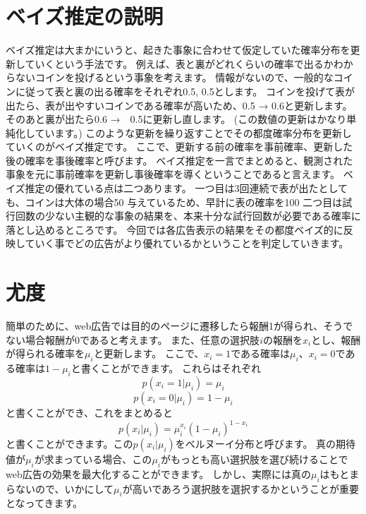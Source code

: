 \documentclass[a4j,twocolumn]{jarticle}
\begin{document}
\section{ベイズ推定の説明}
ベイズ推定は大まかにいうと、起きた事象に合わせて仮定していた確率分布を更新していくという手法です。
例えば、表と裏がどれくらいの確率で出るかわからないコインを投げるという事象を考えます。
情報がないので、一般的なコインに従って表と裏の出る確率をそれぞれ0.5, 0.5とします。
コインを投げて表が出たら、表が出やすいコインである確率が高いため、0.5 → 0.6と更新します。
そのあと裏が出たら0.6 →　0.5に更新し直します。
(この数値の更新はかなり単純化しています。)
このような更新を繰り返すことでその都度確率分布を更新していくのがベイズ推定です。
ここで、更新する前の確率を事前確率、更新した後の確率を事後確率と呼びます。
ベイズ推定を一言でまとめると、観測された事象を元に事前確率を更新し事後確率を導くということであると言えます。
ベイズ推定の優れている点は二つあります。
一つ目は3回連続で表が出たとしても、コインは大体の場合50%
与えているため、早計に表の確率を100%
二つ目は試行回数の少ない主観的な事象の結果を、本来十分な試行回数が必要である確率に落とし込めるところです。
今回では各広告表示の結果をその都度ベイズ的に反映していく事でどの広告がより優れているかということを判定していきます。
\vspace{-6mm}
\section{尤度}
簡単のために、web広告では目的のページに遷移したら報酬1が得られ、そうでない場合報酬が0であると考えます。
また、任意の選択肢$i$の報酬を$x_i$とし、報酬が得られる確率を$\mu_i$と更新します。
ここで、$x_i = 1$である確率は$\mu_i$、$x_i = 0$である確率は$1 - \mu_i$と書くことができます。
これらはそれぞれ
\begin{displaymath}
p(x_i = 1|\mu_i) = \mu_i
\end{displaymath}
\begin{displaymath}
p(x_i = 0|\mu_i) = 1 - \mu_i
\end{displaymath}
と書くことができ、これをまとめると
\begin{displaymath}
p(x_i|\mu_i) = \mu_i^{x_i}(1 - \mu_i)^{1 - x_i}
\end{displaymath}
と書くことができます。この$p(x_i|\mu_i)$をベルヌーイ分布と呼びます。
真の期待値が$\mu_i$が求まっている場合、この$\mu_i$がもっとも高い選択肢を選び続けることでweb広告の効果を最大化することができます。
しかし、実際には真の$\mu_i$はもとまらないので、いかにして$\mu_i$が高いであろう選択肢を選択するかということが重要となってきます。
\end{document}
